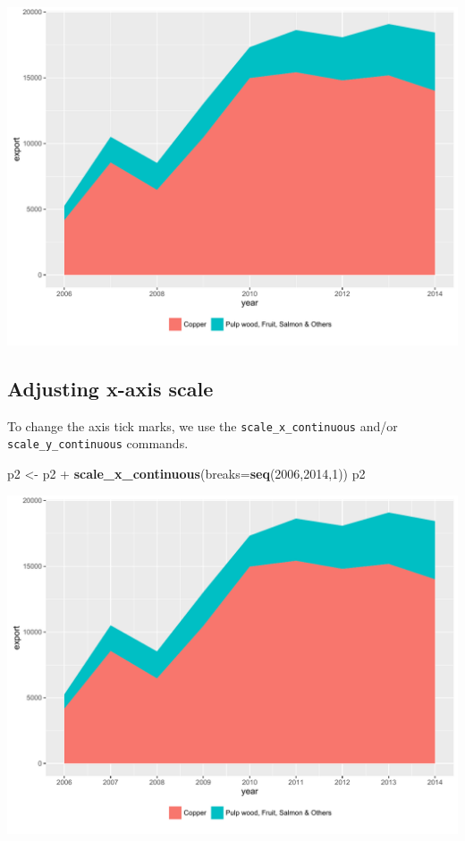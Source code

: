 \documentclass[]{article}
\newenvironment{Shaded}{\begin{snugshade}}{\end{snugshade}}
\newcommand{\KeywordTok}[1]{\textcolor[rgb]{0.13,0.29,0.53}{\textbf{{#1}}}}
\newcommand{\DataTypeTok}[1]{\textcolor[rgb]{0.13,0.29,0.53}{{#1}}}
\newcommand{\DecValTok}[1]{\textcolor[rgb]{0.00,0.00,0.81}{{#1}}}
\newcommand{\StringTok}[1]{\textcolor[rgb]{0.31,0.60,0.02}{{#1}}}
\newcommand{\NormalTok}[1]{{#1}}
\begin{document}
\begin{center}\includegraphics{0_all_posts_pdf/area_3-1} \end{center}

\subsection{Adjusting x-axis scale}\label{adjusting-x-axis-scale-1}

To change the axis tick marks, we use the \texttt{scale\_x\_continuous}
and/or \texttt{scale\_y\_continuous} commands.

\begin{Shaded}
\begin{Highlighting}[]
\NormalTok{p2 <-}\StringTok{ }\NormalTok{p2 +}\StringTok{ }\KeywordTok{scale_x_continuous}\NormalTok{(}\DataTypeTok{breaks=}\KeywordTok{seq}\NormalTok{(}\DecValTok{2006}\NormalTok{,}\DecValTok{2014}\NormalTok{,}\DecValTok{1}\NormalTok{))}
\NormalTok{p2}
\end{Highlighting}
\end{Shaded}

\begin{center}\includegraphics{0_all_posts_pdf/area_4-1} \end{center}
\end{document}

